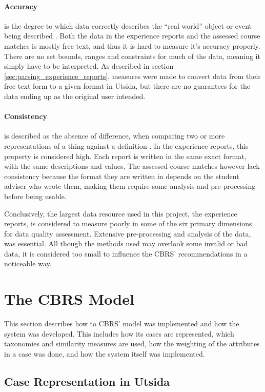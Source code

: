\paragraph{Accuracy} is the degree to which data correctly describes the \enquote{real world} object or event being described \cite{askham2013six}. Both the data in the experience reports and the assessed course matches is mostly free text, and thus it is hard to measure it's accuracy properly. There are no set bounds, ranges and constraints for much of the data, meaning it simply have to be interpreted. As described in section \ref{sec:parsing_experience_reports}, measures were made to convert data from their free text form to a given format in Utsida, but there are no guarantees for the data ending up as the original user intended.

\paragraph{Consistency} is described as the absence of difference, when comparing two or more representations of a thing against a definition \cite{askham2013six}. In the experience reports, this property is considered high. Each report is written in the same exact format, with the same descriptions and values. The assessed course matches however lack consistency because the format they are written in depends on the student adviser who wrote them, making them require some analysis and pre-processing before being usable. 

Conclusively, the largest data resource used in this project, the experience reports, is considered to measure poorly in some of the six primary dimensions for data quality assessment. Extensive pre-processing and analysis of the data, was essential. All though the methods used may overlook some invalid or bad data, it is considered too small to influence the CBRS' recommendations in a noticeable way. 


\section{The CBRS Model}
This section describes how to CBRS' model was implemented and how the system was developed. This includes how its cases are represented, which taxonomies and similarity measures are used, how the weighting of the attributes in a case was done, and how the system itself was implemented.

\subsection{Case Representation in Utsida}

